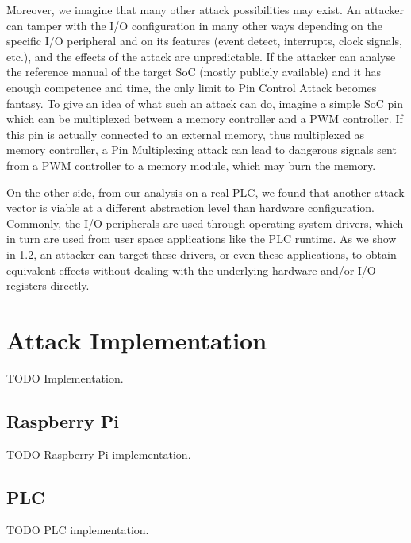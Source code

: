 Moreover, we imagine that many other attack possibilities may exist. An attacker can tamper with the I/O configuration in many other ways depending on the
specific I/O peripheral and on its features (\eg event detect, interrupts, clock signals, etc.), and the effects of the attack are unpredictable.
If the attacker can analyse the reference manual of the target SoC (mostly publicly available) and it has enough competence and time,
the only limit to Pin Control Attack becomes fantasy.
To give an idea of what such an attack can do, imagine a simple SoC pin which can be multiplexed between a memory controller and a PWM controller.
If this pin is actually connected to an external memory, thus multiplexed as memory controller, a Pin Multiplexing attack can lead to dangerous signals
sent from a PWM controller to a memory module, which may burn the memory.

On the other side, from our analysis on a real PLC, we found that another attack vector is viable at a different abstraction level than hardware configuration.
Commonly, the I/O peripherals are used through operating system drivers, which in turn are used from user space applications like the PLC runtime.
As we show in \sec \ref{sec:attack_plc}, an attacker can target these drivers, or even these applications, to obtain equivalent effects without dealing with
the underlying hardware and/or I/O registers directly.


\section{Attack Implementation}
\label{sec:attack_impl}

TODO Implementation.


\subsection{Raspberry Pi}

TODO Raspberry Pi implementation.


\subsection{PLC}
\label{sec:attack_plc}

TODO PLC implementation.
